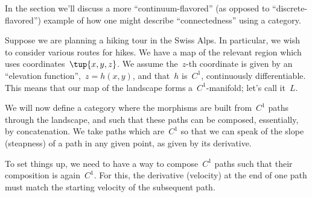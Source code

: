 In the section we'll discuss a more ``continuum-flavored'' (as opposed to ``discrete-flavored'') example of how one might describe ``connectedness'' using a category.


Suppose we are planning a hiking tour in the Swiss Alps. In particular, we wish to consider various routes for hikes. We have a map of the relevant region which uses coordinates~$\tup{x,y,z}$. We assume the~$z$-th coordinate is given by an ``elevation function'',~$z = h(x,y)$, and that~$h$ is~$C^1$,  continuously differentiable. This means that our map of the landscape forms a~$C^1$-manifold; let's call it~$L$.


We will now define a category where the morphisms are built from~$C^1$ paths through the landscape, and such that these paths can be composed, essentially, by concatenation. We take paths which are~$C^1$ so that we can speak of the slope (steapness) of a path in any given point, as given by its derivative.

%
%

To set things up, we need to have a way to compose~$C^1$ paths such that their composition is again~$C^1$. For this, the derivative (velocity) at the end of one path must match the starting velocity of the subsequent path.

